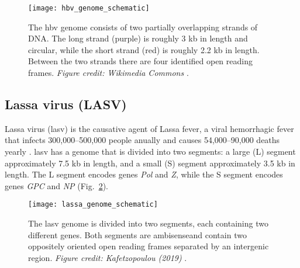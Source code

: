 \begin{figure}[ht]
  \centering
  \medskip
  \texttt{[image: hbv\_genome\_schematic]}
  \caption[Scematic of the HBV genome]{The \gls{hbv} genome consists of two partially overlapping strands of DNA. The long strand (purple) is roughly 3 kb in length and circular, while the short strand (red) is roughly 2.2 kb in length. Between the two strands there are four identified open reading frames. \textit{Figure credit: Wikimedia Commons} \cite{HBVwiki}.}
  \label{fig:hbvGenome}
\end{figure}

\subsection{Lassa virus (LASV)}

Lassa virus (\gls{lasv}) is the causative agent of Lassa fever, a viral hemorrhagic fever that infects 300,000--500,000 people anually and causes 54,000--90,000 deaths yearly \cite{lianaThesis, asogun2012molecular}.
\gls{lasv} has a genome that is divided into two segments: a large (L) segment approximately 7.5 kb in length, and a small (S) segment approximately 3.5 kb in length.
The L segment encodes genes \textit{Pol} and \textit{Z}, while the S segment encodes genes \textit{GPC} and \textit{NP} (Fig.~\ref{fig:lasvGenome}).

\begin{figure}[ht]
  \centering
  \medskip
  \texttt{[image: lassa\_genome\_schematic]}
  \caption[Scematic of the LASV genome]{The \gls{lasv} genome is divided into two segments, each containing two different genes. Both segments are ambisenseand contain two oppositely oriented open reading frames separated by an intergenic region. \textit{Figure credit: Kafetzopoulou (2019)} \cite{lianaThesis}.}
  \label{fig:lasvGenome}
\end{figure}

\cleardoublepage


